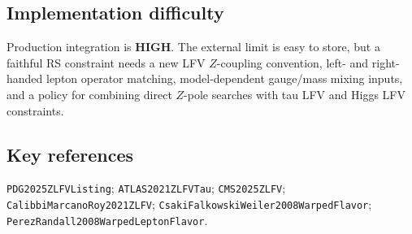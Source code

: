 \subsection*{Implementation difficulty}
Production integration is \textbf{HIGH}.  The external limit is easy to store,
but a faithful RS constraint needs a new LFV \(Z\)-coupling convention, left-
and right-handed lepton operator matching, model-dependent gauge/mass mixing
inputs, and a policy for combining direct \(Z\)-pole searches with tau LFV and
Higgs LFV constraints.

\subsection*{Key references}
\texttt{PDG2025ZLFVListing}; \texttt{ATLAS2021ZLFVTau};
\texttt{CMS2025ZLFV}; \texttt{CalibbiMarcanoRoy2021ZLFV};
\texttt{CsakiFalkowskiWeiler2008WarpedFlavor};
\texttt{PerezRandall2008WarpedLeptonFlavor}.
